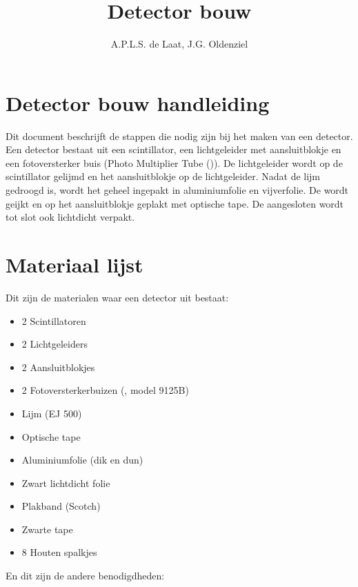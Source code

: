 

\title{Detector bouw}
\author{A.P.L.S. de Laat, J.G. Oldenziel} 



\maketitle

\section{Detector bouw handleiding}

Dit document beschrijft de stappen die nodig zijn bij het
maken van een \hisparc detector. Een detector bestaat uit een
scintillator, een lichtgeleider met aansluitblokje en een fotoversterker
buis (Photo Multiplier Tube (\pmt)). De lichtgeleider wordt op de
scintillator gelijmd en het aansluitblokje op de lichtgeleider. Nadat de
lijm gedroogd is, wordt het geheel ingepakt in aluminiumfolie en
vijverfolie. De \pmt wordt geijkt en op het aansluitblokje geplakt met
optische tape. De aangesloten \pmt wordt tot slot ook lichtdicht verpakt. 


\section{Materiaal lijst}

Dit zijn de materialen waar een detector uit bestaat:

\begin{itemize}
    \item 2 Scintillatoren
    \item 2 Lichtgeleiders
    \item 2 Aansluitblokjes
    \item 2 Fotoversterkerbuizen (\pmt, model 9125B)
    \item Lijm (EJ 500)
    \item Optische tape
    \item Aluminiumfolie (dik en dun)
    \item Zwart lichtdicht folie
    \item Plakband (Scotch)
    \item Zwarte tape
    \item 8 Houten spalkjes
\end{itemize}

En dit zijn de andere benodigdheden:

